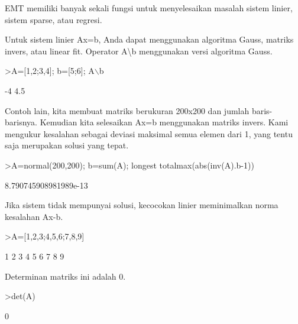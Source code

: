 \begin{eulernotebook}
\begin{eulercomment}
\begin{eulercomment}
\begin{euleroutput}
\end{euleroutput}
\begin{eulercomment}
EMT memiliki banyak sekali fungsi untuk menyelesaikan masalah sistem
linier, sistem sparse, atau regresi.

Untuk sistem linier Ax=b, Anda dapat menggunakan algoritma Gauss,
matriks invers, atau linear fit. Operator A\textbackslash{}b menggunakan versi
algoritma Gauss.
\end{eulercomment}
\begin{eulerprompt}
>A=[1,2;3,4]; b=[5;6]; A\(\backslash\)b
\end{eulerprompt}
\begin{euleroutput}
             -4 
            4.5 
\end{euleroutput}
\begin{eulercomment}
Contoh lain, kita membuat matriks berukuran 200x200 dan jumlah
baris-barisnya. Kemudian kita selesaikan Ax=b menggunakan matriks
invers. Kami mengukur kesalahan sebagai deviasi maksimal semua elemen
dari 1, yang tentu saja merupakan solusi yang tepat.
\end{eulercomment}
\begin{eulerprompt}
>A=normal(200,200); b=sum(A); longest totalmax(abs(inv(A).b-1))
\end{eulerprompt}
\begin{euleroutput}
    8.790745908981989e-13 
\end{euleroutput}
\begin{eulercomment}
Jika sistem tidak mempunyai solusi, kecocokan linier meminimalkan
norma kesalahan Ax-b.
\end{eulercomment}
\begin{eulerprompt}
>A=[1,2,3;4,5,6;7,8,9]
\end{eulerprompt}
\begin{euleroutput}
              1             2             3 
              4             5             6 
              7             8             9 
\end{euleroutput}
\begin{eulercomment}
Determinan matriks ini adalah 0.
\end{eulercomment}
\begin{eulerprompt}
>det(A)
\end{eulerprompt}
\begin{euleroutput}
  0\\
  

\end{euleroutput}
\end{eulercomment}
\end{eulercomment}
\end{eulernotebook}
